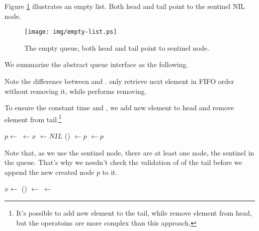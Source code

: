 \documentclass{article}
\begin{document}
Figure \ref{fig:empty-list} illustrates an empty list. Both head
and tail point to the sentinel NIL node.

\begin{figure}[htbp]
  \centering
  \texttt{[image: img/empty-list.ps]}
  \caption{The empty queue, both head and tail point to sentinel node.} \label{fig:empty-list}
\end{figure}

We summarize the abstract queue interface as the following.

\begin{algorithmic}
\EndFunction
{}
\EndFunction
{}
\EndFunction
{}
\EndFunction
{}
\EndFunction
\end{algorithmic}

Note the difference between  and .
 only retrieve next element in FIFO order without removing
it, while  performs removing.

To ensure the constant time  and ,
we add new element to head and remove element from tail.\footnote{It's possible
to add new element to the tail, while remove element from head, but the 
operatoins are more complex than this approach.}

\begin{algorithmic}
  \State $p \gets $ 
  \State {} $\gets x$
  \State {} $\gets NIL$
  \State {}() $\gets p$
  \State {} $\gets p$
\EndFunction
\end{algorithmic}

Note that, as we use the sentinel node, there are at least one node, the
sentinel in the queue. That's why we needn't check the validation of
of the tail before we append the new created node $p$ to it.

\begin{algorithmic}
  \State $x \gets $ 
  \State {}() $\gets$ 
   
    \State {} $\gets$ 
  \EndIf
  \State \Return {}
\EndFunction
\end{algorithmic}
\end{document}

